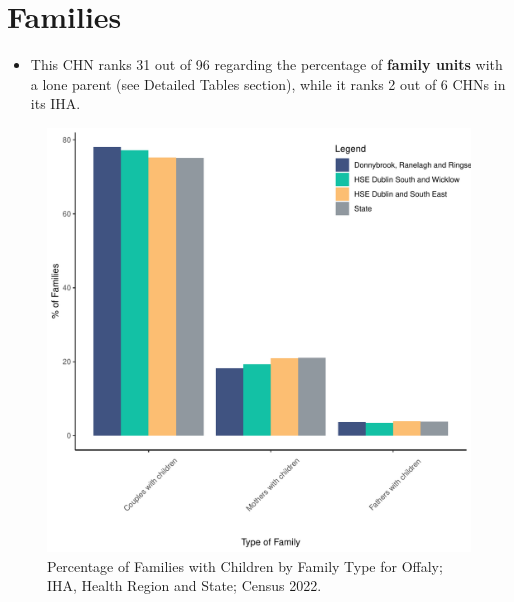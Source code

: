 \documentclass{article}
\begin{document}
\section{Families}\label{sect:Fam}
\begin{itemize}
\item This CHN ranks  31 out of 96 regarding the percentage of \textbf{family units} with a lone parent (see Detailed Tables section), while it ranks   2 out of 6 CHNs in its IHA.
\end{itemize}
\begin{figure}[H]
	\centering
	\includegraphics[width = 150mm]{../figures/FamED.pdf}
	\caption{Percentage of Families with Children by Family Type for Offaly; IHA, Health Region and State; Census 2022.}
	\label{fig:vbnv}
	\end{figure}
	
\end{document}
